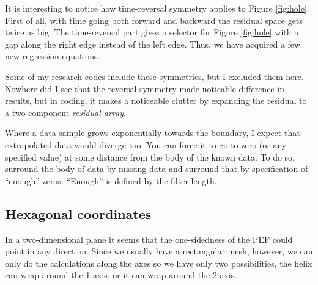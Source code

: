 \par
It is interesting to notice how time-reversal symmetry applies
to Figure \ref{fig:hole}.
First of all, with time going both forward and backward
the residual space gets twice as big.
The time-reversal part gives a selector
for Figure \ref{fig:hole} with
a gap along the right edge instead of the left edge.
Thus, we have acquired a few new regression equations.

\par
Some of my research codes include these symmetries,
but I excluded them here.
Nowhere did I see that the reversal symmetry made noticable difference
in results,
but in coding, it makes a noticeable clutter by
expanding the residual to a two-component {\it residual array}.

\par
Where a data sample grows exponentially towards the boundary,
I expect that extrapolated data would diverge too.
You can force it to go to zero (or any specified value)
at some distance from the body of the known data.
To do so, surround the body of data by missing data and surround that
by specification of ``enough'' zeros.
``Enough'' is defined by the filter length.


\subsection{Hexagonal coordinates}
\par
In a two-dimensional plane it seems
that the one-sidedness of the PEF could
point in any direction.
Since we usually have a rectangular mesh, however,
we can only do the calculations along the axes
so we have only two possibilities,
the helix can
wrap around the 1-axis,
or it can
wrap around the 2-axis.


